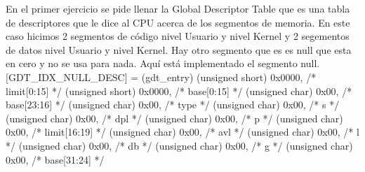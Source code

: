 En el primer ejercicio se pide llenar la Global Descriptor Table que es una tabla de descriptores que le dice al CPU acerca de los segmentos de memoria.
En este caso hicimos 2 segmentos de código nivel Usuario y nivel Kernel y 2 segementos de datos nivel Usuario y nivel Kernel.
Hay otro segmento que es es null que esta en cero y no se usa para nada.
Aquí está implementado el segmento null.
[GDT_IDX_NULL_DESC] = (gdt_entry) {
        (unsigned short)    0x0000,         /* limit[0:15]  */
        (unsigned short)    0x0000,         /* base[0:15]   */
        (unsigned char)     0x00,           /* base[23:16]  */
        (unsigned char)     0x00,           /* type         */
        (unsigned char)     0x00,           /* s            */
        (unsigned char)     0x00,           /* dpl          */
        (unsigned char)     0x00,           /* p            */
        (unsigned char)     0x00,           /* limit[16:19] */
        (unsigned char)     0x00,           /* avl          */
        (unsigned char)     0x00,           /* l            */
        (unsigned char)     0x00,           /* db           */
        (unsigned char)     0x00,           /* g            */
        (unsigned char)     0x00,           /* base[31:24]  */
    }
   
   
   
